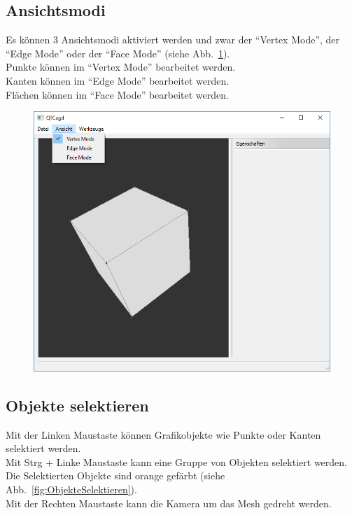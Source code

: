 \subsection{Ansichtsmodi}
Es können 3 Ansichtsmodi aktiviert werden und zwar der "`Vertex Mode"', der "`Edge Mode"' oder der "`Face Mode"' (siehe Abb.~\ref{fig:Ansichtsmodi}).\\
Punkte können im "`Vertex Mode"' bearbeitet werden.\\
Kanten können im "`Edge Mode"' bearbeitet werden.\\
Flächen können im "`Face Mode"' bearbeitet werden.

\begin{figure}[H]
	\centering
	\includegraphics[scale=0.5]{content/pictures/2-Ansichtsmodi}
	\caption{}
	\label{fig:Ansichtsmodi}
\end{figure}

\subsection{Objekte selektieren}
Mit der Linken Maustaste können Grafikobjekte wie Punkte oder Kanten selektiert werden.\\
Mit Strg + Linke Maustaste kann eine Gruppe von Objekten selektiert werden.\\
Die Selektierten Objekte sind orange gefärbt (siehe Abb.~\ref{fig:ObjekteSelektieren}).\\
Mit der Rechten Maustaste kann die Kamera um das Mesh gedreht werden.\\

